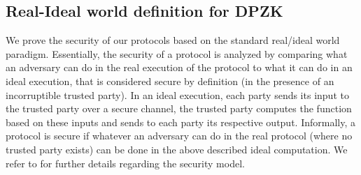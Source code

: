 \subsection{Real-Ideal world definition for DPZK}

We prove the security of our protocols based on the standard real/ideal world paradigm.  Essentially, the security of a protocol is analyzed by comparing what an adversary can do in the real execution of the protocol to what it can do in an ideal execution,  that is considered secure by definition (in the presence of an incorruptible trusted party). In an ideal execution, each party sends its input to the trusted party over a secure channel, the trusted party computes the function based on these inputs and sends to each party its respective output.  Informally, a protocol
is secure if whatever an adversary can do in the real protocol (where no trusted party exists) can be done in the above described ideal computation. We refer to \cite{Canetti00,Goldreich2001,Lindell17,CohenL14} for further details regarding the security model.  


